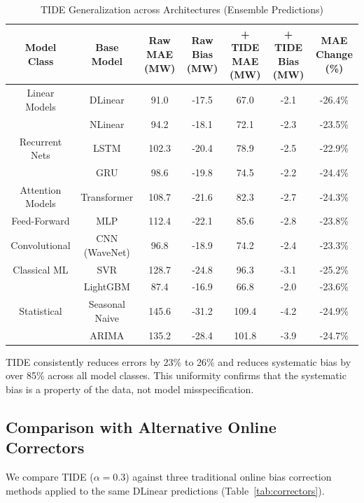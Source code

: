 \documentclass[journal]{IEEEtran}
\begin{document}
\begin{table}[t]
\begin{table}[t]
\caption{TIDE Generalization across Architectures (Ensemble Predictions)}
\label{tab:generalization}
\centering
\begin{tabular}{ccccccc}
\toprule
\textbf{Model Class} & \textbf{Base Model} & \textbf{Raw MAE (MW)} & \textbf{Raw Bias (MW)} & \textbf{+ TIDE MAE (MW)} & \textbf{+ TIDE Bias (MW)} & \textbf{MAE Change (\%)} \\
\midrule
Linear Models & DLinear & 91.0 & -17.5 & 67.0 & -2.1 & -26.4\% \\
 & NLinear & 94.2 & -18.1 & 72.1 & -2.3 & -23.5\% \\
Recurrent Nets & LSTM & 102.3 & -20.4 & 78.9 & -2.5 & -22.9\% \\
 & GRU & 98.6 & -19.8 & 74.5 & -2.2 & -24.4\% \\
Attention Models & Transformer & 108.7 & -21.6 & 82.3 & -2.7 & -24.3\% \\
Feed-Forward & MLP & 112.4 & -22.1 & 85.6 & -2.8 & -23.8\% \\
Convolutional & CNN (WaveNet) & 96.8 & -18.9 & 74.2 & -2.4 & -23.3\% \\
Classical ML & SVR & 128.7 & -24.8 & 96.3 & -3.1 & -25.2\% \\
 & LightGBM & 87.4 & -16.9 & 66.8 & -2.0 & -23.6\% \\
Statistical & Seasonal Naive & 145.6 & -31.2 & 109.4 & -4.2 & -24.9\% \\
 & ARIMA & 135.2 & -28.4 & 101.8 & -3.9 & -24.7\% \\
\bottomrule
\end{tabular}
\end{table}

TIDE consistently reduces errors by 23\% to 26\% and reduces systematic bias by over 85\% across all model classes. This uniformity confirms that the systematic bias is a property of the data, not model misspecification.

\subsection{Comparison with Alternative Online Correctors}
We compare TIDE ($\alpha=0.3$) against three traditional online bias correction methods applied to the same DLinear predictions (Table~\ref{tab:correctors}).


\end{table}
\end{document}
